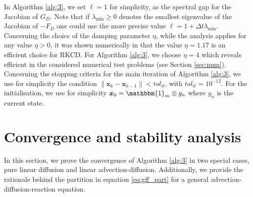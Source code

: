 \documentclass[10pt,a4paper]{article}
\newtheorem{remark}[theorem]{Remark}
\begin{document}
In Algorithm \ref{alg:3}, we set $\ell=1$ for simplicity, as the spectral gap for the Jacobian of $G_D$. Note that if $\lambda_{\min}\geq 0$ denotes the smallest eigenvalue of the Jacobian of $-F_D$ one could use the more precise value $\ell=1+\Delta t\lambda_{\min}$. 
Concerning the choice of the damping parameter $\eta$, while the analysis applies for any value $\eta>0$, it was shown numerically in \cite{EVVZ21} that the value $\eta=1.17$ is an efficient choice for RKCD. For Algorithm \ref{alg:3}, we choose $\eta=4$ which reveals efficient in the considered numerical test problems (see Section \ref{sec:num}). Concerning the stopping criteria for the main iteration of Algorithm \ref{alg:3}, we use for simplicity the condition $\|\boldsymbol{x}_k-\boldsymbol{x}_{k-1}\|<tol_{it}$, with $tol_{it}=10^{-12}$. For the initialisation, we use for simplicity $\boldsymbol{x}_0=\mathbbm{1}_m\otimes y_n$ where $y_n$ is the current state.







\section{Convergence and stability analysis} \label{sec:conv}
In this section, we prove the convergence of Algorithm \ref{alg:3} in two special cases, pure linear diffusion and linear advection-diffusion. Additionally, we provide the rationale behind the partition in equation \eqref{eq:gff_part} for a general advection-diffusion-reaction equation.
\end{document}
